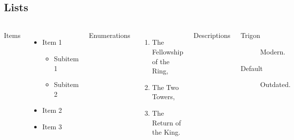\subsection{Lists}
\begin{frame}{\insertsectionhead}
  \framesubtitle{\insertsubsectionhead}
  \begin{columns}[T,onlytextwidth]
    Items
    \begin{itemize}
      \item Item 1
        \begin{itemize}
          \item Subitem 1
          \item Subitem 2
        \end{itemize}
      \item Item 2
      \item Item 3
    \end{itemize}

    Enumerations
    \begin{enumerate}
      \item The Fellowship of the Ring,
      \item The Two Towers,
      \item The Return of the King.
    \end{enumerate}

    Descriptions
    \begin{description}
      \item[Trigon] Modern. \item[Default] Outdated.
    \end{description}
  \end{columns}
\end{frame}

